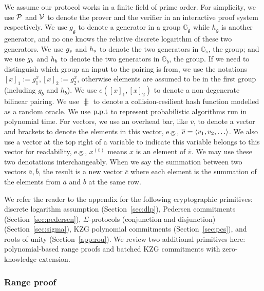 We assume our protocol works in a finite field of prime order. For simplicity, we use $\mathcal{P}$ and $\mathcal{V}$ to denote the prover and the verifier in an interactive proof system respectively. We use $g_\mathfrak{g}$ to denote a generator in a group $\mathbb{G}_\mathfrak{g}$ while $h_\mathfrak{g}$ is another generator, and no one knows the relative discrete logarithm of these two generators. We use $g_s$ and $h_s$ to denote the two generators in $\mathbb{G}_s$, the \secp group; and we use $g_b$ and $h_b$ to denote the two generators in $\mathbb{G}_b$, the \bls group. If we need to distinguish which group an input to the pairing is from, we use the notations $[x]_1:=g_1^x,[x]_2:=g_2^x$, otherwise elements are  assumed to be in the first group (including $g_b$ and $h_b$). We use $e([x]_1,[x]_2)$ to denote a non-degenerate bilinear pairing. We use $\hash$ to denote a collision-resilient hash function modelled as a random oracle. We use $\text{p.p.t}$ to represent probabilistic algorithms run in polynomial time.  For vectors, we use an overhead bar, like $\overline{v}$, to denote a vector and brackets to denote the elements in this vector, e.g., $\overline{v}=\tuple{v_1,v_2,\dots}$. We also use a vector at the top right of a variable to indicate this variable belongs to this vector for readability, e.g., $x^{(\overline{v})}$ means $x$ is an element of $\overline{v}$. We may use these two denotations interchangeably. When we say the summation between two vectors $\overline{a},\overline{b}$, the result is a new vector $\overline{c}$ where each element is the summation of the elements from $\overline{a}$ and $\overline{b}$ at the same row.

We refer the reader to the appendix for the following cryptographic primitives: discrete logarithm assumption (Section~\ref{sec:dlp}), Pedersen commitments (Section~\ref{sec:pedersen}), $\Sigma$-protocols (conjunction and disjunction) (Section~\ref{sec:sigma}), KZG polynomial commitments (Section~\ref{sec:pcs}), and roots of unity (Section~\ref{app:rou}). We review two additional primitives here: polynomial-based range proofs and batched KZG commitments with zero-knowledge extension.

\subsubsection{Range proof}
\label{sec:range}

